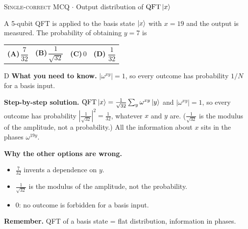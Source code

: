\documentclass[11pt,a4paper]{article}
\newcommand{\optlabel}[1]{\textbf{(#1)}}
\newcommand{\correctlabel}[1]{\textcolor{okgreen}{\textbf{(#1)}\,\ding{51}}}
\newenvironment{qitem}[1]{\begin{list}{}{\setlength{\leftmargin}{3.3em}\setlength{\labelwidth}{3.1em}%
  \setlength{\labelsep}{0.2em}\setlength{\topsep}{3pt}\setlength{\parsep}{3pt}}\item[\textbf{Q.#1}\hfill]}{\end{list}}
\newcommand{\qsep}{\par\vspace{2pt}{\color{black!15}\hrule}\vspace{4pt}}
\newcommand{\qmeta}[2]{{\footnotesize\color{black!60}\textsc{#1} \;$\cdot$\; #2}\par}
\begin{document}
\begin{qitem}{42}
\qmeta{Single-correct MCQ}{Output distribution of $\mathrm{QFT}\ket{x}$}
A 5-qubit QFT is applied to the basis state $\ket{x}$ with $x = 19$ and the output is measured. The probability of
obtaining $y = 7$ is
\par\smallskip\noindent\begin{tabularx}{\linewidth}{@{}*{4}{L}@{}}
\optlabel{A}\,$\dfrac{7}{32}$ & \optlabel{B}\,$\dfrac{1}{\sqrt{32}}$ & \optlabel{C}\,$0$ & \correctlabel{D}\,$\dfrac{1}{32}$
\end{tabularx}
\end{qitem}
\begin{solbox}{D}
\textbf{\color{brand}What you need to know.} $|\omega^{xy}| = 1$, so every outcome has probability $1/N$ for a basis input.

\textbf{\color{brand}Step-by-step solution.} $\mathrm{QFT}\ket{x} = \frac{1}{\sqrt{32}}\sum_y \omega^{xy}\ket y$ and $|\omega^{xy}| = 1$, so every outcome has probability
$\left|\frac{1}{\sqrt{32}}\right|^2 = \frac{1}{32}$, whatever $x$ and $y$ are. ($\frac{1}{\sqrt{32}}$ is the modulus of the amplitude,
not a probability.) All the information about $x$ sits in the phases $\omega^{19y}$.

\textbf{\color{brand}Why the other options are wrong.}
\begin{itemize}[leftmargin=2.4em, itemsep=1pt, topsep=2pt]
\item[\textbf{(A)}] $\frac{7}{32}$ invents a dependence on $y$.
\item[\textbf{(B)}] $\frac{1}{\sqrt{32}}$ is the modulus of the amplitude, not the probability.
\item[\textbf{(C)}] $0$: no outcome is forbidden for a basis input.
\end{itemize}
\textbf{\color{brand}Remember.} QFT of a basis state = flat distribution, information in phases.
\end{solbox}
\qsep
\end{document}
